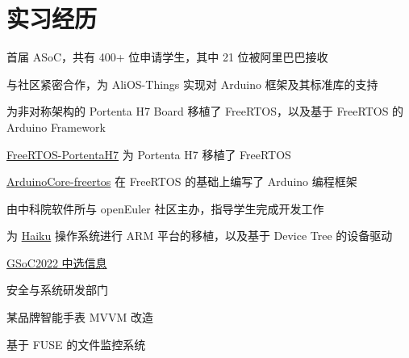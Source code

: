 \documentclass[]{deedy-resume-openfont}
\begin{document}
\begin{minipage}[t]{0.73\textwidth} 


\section{实习经历}
\vspace{\topsep}
\begin{tightemize}
    \item 首届 ASoC，共有 400+ 位申请学生，其中 21 位被阿里巴巴接收
    \item 与社区紧密合作，为 AliOS-Things 实现对 Arduino 框架及其标准库的支持
\end{tightemize}
\sectionsep

\begin{tightemize}
\item 为非对称架构的 Portenta H7 Board 移植了 FreeRTOS，以及基于 FreeRTOS 的 Arduino Framework
\item \href{https://github.com/MRNIU/FreeRTOS-PortentaH7}{FreeRTOS-PortentaH7} 为 Portenta H7 移植了 FreeRTOS
\item \href{https://github.com/MRNIU/ArduinoCore-freertos}{ArduinoCore-freertos} 在 FreeRTOS 的基础上编写了 Arduino 编程框架
\end{tightemize}
\sectionsep

\begin{tightemize}
\item 由中科院软件所与 openEuler 社区主办，指导学生完成开发工作
\end{tightemize}
\sectionsep

\begin{tightemize}
\item 为 \href{https://www.haiku-os.org}{Haiku} 操作系统进行 ARM 平台的移植，以及基于 Device Tree 的设备驱动
\item \href{https://summerofcode.withgoogle.com/programs/2022/projects/y2L1QWf1}{GSoC2022 中选信息}
\end{tightemize}
\sectionsep

\begin{tightemize}
\item 安全与系统研发部门
\item 某品牌智能手表 MVVM 改造
\item 基于 FUSE 的文件监控系统
\end{tightemize}
\sectionsep


\end{minipage}
\end{document}

